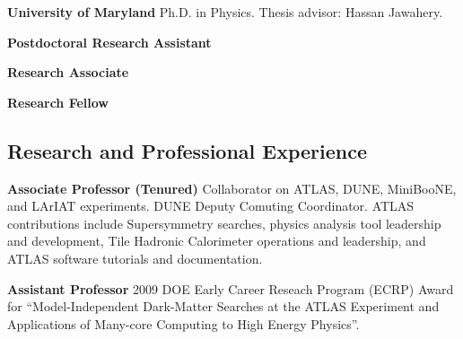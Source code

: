 \documentclass[11pt,]{article}
\begin{document}
\par{\sc \bf{ University of Maryland}}
Ph.D. in Physics. Thesis advisor: Hassan Jawahery.\\

\par{\sc \bf{Postdoctoral Research Assistant}} 

\par{\sc \bf{Research Associate}}   

\par{\sc \bf{Research Fellow}}
 


\subsection*{Research and Professional Experience}
\par{\sc \bf{Associate Professor (Tenured)}}  
Collaborator on ATLAS, DUNE, MiniBooNE, and LArIAT experiments. DUNE
Deputy Comuting Coordinator. ATLAS contributions include Supersymmetry searches, physics analysis tool leadership
 and development, Tile Hadronic Calorimeter operations and leadership,
 and ATLAS software tutorials and documentation.  

 \par{\sc \bf{Assistant Professor}}  
2009 DOE Early Career Reseach Program (ECRP) Award for
``Model-Independent Dark-Matter Searches at the ATLAS Experiment and
Applications of Many-core Computing to High Energy Physics''. 
\end{document}

